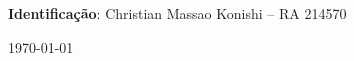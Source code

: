 \documentclass[11pt,letter]{article}
\begin{document}
	\begin{spacing}{1.3}
		\setcounter{page}{1}
		\noindent \textbf{Identificação}: Christian Massao Konishi -- RA 214570\\
		
		\vspace*{\fill}
		
		\centerline{\today}
		
		\newpage
		
		
		
		
		\printbibliography 
	\end{spacing}
	
	\vfill
	
\end{document}
